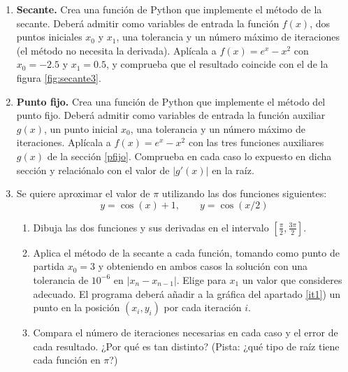 \begin{enumerate}
\item \textbf{Secante.} Crea una función de Python que implemente el método de la secante. Deberá admitir como variables de entrada la función $f(x)$, dos puntos iniciales $x_0$ y $x_1$, una tolerancia y un número máximo de iteraciones (el método no necesita la derivada). Aplícala a $f(x) = e^x-x^2$ con $x_0=-2.5$ y $x_1=0.5$, y comprueba que el resultado coincide con el de la figura \ref{fig:secante3}.

\item \textbf{Punto fijo.} Crea una función de Python que implemente el método del punto fijo. Deberá admitir como variables de entrada la función auxiliar $g(x)$, un punto inicial $x_0$, una tolerancia y un número máximo de iteraciones. Aplícala a $f(x) = e^x-x^2$ con las tres funciones auxiliares $g(x)$ de la sección \ref{pfijo}. Comprueba en cada caso lo expuesto en dicha sección y relaciónalo con el valor de $\vert g'(x)\vert$ en la raíz.

\item Se quiere aproximar el valor de $\pi$ utilizando las dos funciones siguientes:
\begin{equation*}
y=\cos(x)+1, \qquad y=\cos(x/2)
\end{equation*}
\begin{enumerate}
\item \label{it1}Dibuja las dos funciones y sus derivadas en el intervalo $[\frac{\pi}{2},\frac{3\pi}{2}]$.
\item Aplica el método de la secante a cada función, tomando como punto de partida $x_0=3$ y obteniendo en ambos casos la solución con una tolerancia de $10^{-6}$ en $\vert x_n-x_{n-1}\vert$. Elige para $x_1$ un valor que consideres adecuado.
El programa deberá añadir a la gráfica del apartado \ref{it1}) un punto en la posición $(x_i,y_i)$ por cada iteración $i$.
\item Compara el número de iteraciones necesarias en cada caso y el error de cada resultado. ¿Por qué es tan distinto? (Pista: ¿qué tipo de raíz tiene cada función en $\pi$?)
\end{enumerate}


\end{enumerate}
